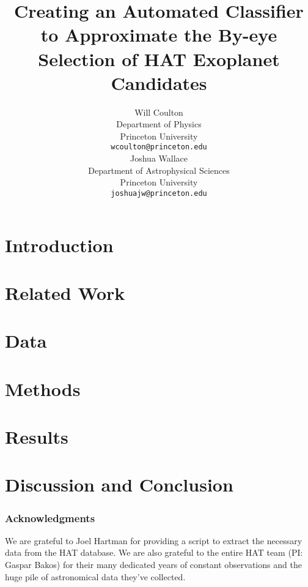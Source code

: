 \documentclass{article} %
\title{Creating an Automated Classifier to Approximate the By-eye
  Selection of HAT Exoplanet Candidates}
\author{
Will Coulton \\
Department of Physics \\
Princeton University\\
\texttt{wcoulton@princeton.edu} \\
\And
Joshua Wallace\\
Department of Astrophysical Sciences\\
Princeton University\\
\texttt{joshuajw@princeton.edu} \\
}
\begin{document}
\maketitle

\begin{abstract}

\end{abstract}

\section{Introduction}



\section{Related Work}


\section{Data}


\section{Methods}


\section{Results}



\section{Discussion and Conclusion}


\subsubsection*{Acknowledgments}
We are grateful to Joel Hartman for providing a script to extract the
necessary data from the HAT database.  We are also grateful to the
entire HAT team (PI: Gaspar Bakos) for their many dedicated years of
constant observations and the huge pile of astronomical data they've collected.




\end{document}
